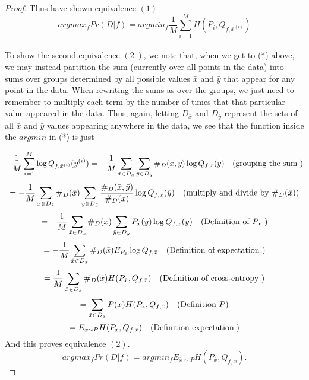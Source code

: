\documentclass{article}
\begin{document}
\begin{proof}
Thus have shown equivalence $(1)$
 $$argmax_{f} Pr(D \vert f)  = argmin_{f} \frac{1}{M}\sum_{i=1}^{M} H(P_{i}, Q_{f, \bar{x}^{(i)}})$$  \\
To show the second equivalence $(2.)$, we note that, when we get to (*) above, we may instead partition the sum (currently over all points in the data) into sums over groups determined by all possible values $\bar{x}$ and $\bar{y}$ that appear for any point in the data.  When rewriting the sums as over the groups, we just need to remember to multiply each term by the number of times that that particular value appeared in the data.  Thus, again, letting $D_{\bar{x}}$ and $D_{\bar{y}}$ represent the sets of all $\bar{x}$ and $\bar{y}$ values appearing anywhere in the data, we see that the function inside the $argmin$ in (*) is just

$$ - \frac{1}{M}\sum_{i=1}^{M} \log{Q_{f, \bar{x}^{(i)}} (\bar{y}^{(i)})}  = - \frac{1}{M}\sum_{\bar{x} \in D_{\bar{x}} } \sum_{\bar{y}\in D_{\bar{y}}} \#_{D} (\bar{x}, \bar{y}) \log{Q_{f, \bar{x}} (\bar{y})}   \quad \hbox{(grouping the sum )}$$
$$=  -\frac{1}{M} \sum_{\bar{x} \in D_{\bar{x}} } \#_{D} (\bar{x}) \sum_{\bar{y}\in D_{\bar{y}}} \frac{\#_{D}(\bar{x}, \bar{y})}{\#_{D}(\bar{x})} \log{Q_{f, \bar{x}} (\bar{y})} \quad \hbox{(multiply and divide by $\#_{D}(\bar{x}))$}$$
$$= -\frac{1}{M} \sum_{\bar{x} \in D_{\bar{x}} } \#_{D}(\bar{x}) \sum_{\bar{y}\in D_{\bar{y}}} P_{\bar{x}}(\bar{y}) \log{Q_{f, \bar{x}} (\bar{y})}  \quad \hbox{(Definition of $P_{\bar{x}}$ )} $$
$$= - \frac{1}{M}\sum_{\bar{x} \in D_{\bar{x}} } \#_{D}(\bar{x}) E_{P_{\bar{x}}}  \log{Q_{f, \bar{x}}}  \quad \hbox{(Definition of expectation )} $$
$$= \frac{1}{M}\sum_{\bar{x} \in D_{\bar{x}} } \#_{D}(\bar{x}) H(P_{\bar{x}}, Q_{f, \bar{x}})  \quad \hbox{(Definition of cross-entropy )} $$
$$= \sum_{\bar{x} \in D_{\bar{x}} } P(\bar{x})H(P_{\bar{x}}, Q_{f, \bar{x}})  \quad \hbox{(Definition $P$)} $$
$$= E_{\bar{x}\sim P} H(P_{\bar{x}}, Q_{f, \bar{x}})  \quad \hbox{(Definition expectation.)} $$
And this proves equivalence $(2)$. 
$$argmax_{f} Pr(D \vert f)  = argmin_{f} E_{\bar{x}\sim P} H(P_{\bar{x}}, Q_{f, \bar{x}}).$$

\end{proof}
\end{document}
